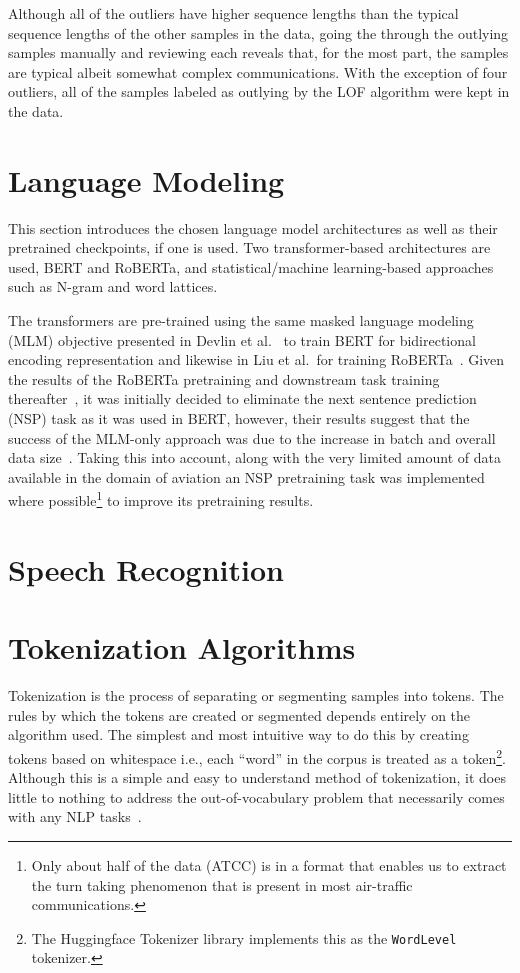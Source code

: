 \documentclass[12pt]{article}
\begin{document}
Although all of the outliers have higher sequence lengths than the typical sequence lengths of the other samples in the data, going the through
the outlying samples manually and reviewing each reveals that, for the most part, the samples are typical albeit somewhat complex communications.
With the exception of four outliers, all of the samples labeled as outlying by the LOF algorithm were kept in the data.

\section{Language Modeling}
This section introduces the chosen language model architectures as well as their pretrained checkpoints, if one is used. Two transformer-based
architectures are used, BERT and RoBERTa, and statistical/machine learning-based approaches such as N-gram and word lattices.

The transformers are pre-trained using the same masked language modeling (MLM) objective presented in Devlin et al.~\cite{devlin_bert_2019} to train
BERT for bidirectional encoding representation and likewise in Liu et al.~for training RoBERTa~\cite{liu_roberta_2019}. Given the results of the
RoBERTa pretraining and downstream task training thereafter~\cite{liu_roberta_2019}, it was initially decided to eliminate the next sentence prediction
(NSP) task as it was used in BERT, however, their results suggest that the success of the MLM-only approach was due to the increase in batch and
overall data size~\cite{liu_roberta_2019}. Taking this into account, along with the very limited amount of data available in the domain of aviation
an NSP pretraining task was implemented where possible\footnote{Only about half of the data (ATCC) is in a format that enables us to extract the turn
    taking phenomenon that is present in most air-traffic communications.} to improve its pretraining results.



\section{Speech Recognition}


\section{Tokenization Algorithms}
Tokenization is the process of separating or segmenting samples into tokens. The rules by which the tokens are created or segmented depends entirely
on the algorithm used. The simplest and most intuitive way to do this by creating tokens based on whitespace i.e., each ``word'' in the corpus
is treated as a token\footnote{The Huggingface Tokenizer library implements this as the \lstinline|WordLevel| tokenizer.}. Although this is a simple
and easy to understand method of tokenization, it does little to nothing to address the out-of-vocabulary problem that necessarily comes with any
NLP tasks~\cite{wu_googles_2016}.
\end{document}
